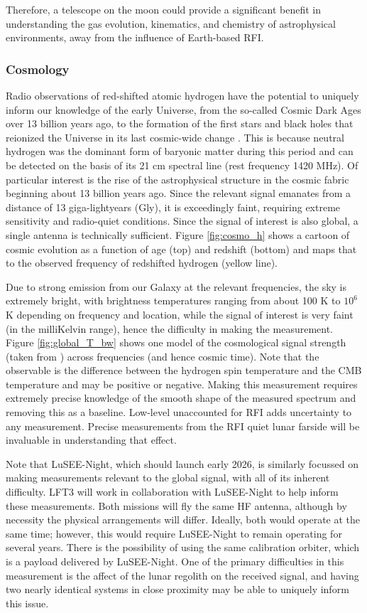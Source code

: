 Therefore, a telescope on the moon could provide a significant benefit in understanding the gas evolution, kinematics, and chemistry of astrophysical environments, away from the influence of Earth-based RFI.

\subsubsection{Cosmology}
Radio observations of red-shifted atomic hydrogen have the potential to uniquely inform our knowledge of the early Universe, from the so-called Cosmic Dark Ages over 13 billion years ago, to the formation of the first stars and black holes that reionized the Universe in its last cosmic-wide change \citep{Fialkov_2024}. This is because neutral hydrogen was the dominant form of baryonic matter during this period and can be detected on the basis of its 21 cm spectral line (rest frequency 1420 MHz). Of particular interest is the rise of the astrophysical structure in the cosmic fabric beginning about 13 billion years ago.  Since the relevant signal emanates from a distance of 13 giga-lightyears (Gly), it is exceedingly faint, requiring extreme sensitivity and radio-quiet conditions.  Since the signal of interest is also global, a single antenna is technically sufficient.  Figure \ref{fig:cosmo_h} shows a cartoon of cosmic evolution as a function of age (top) and redshift (bottom) and maps that to the observed frequency of redshifted hydrogen (yellow line).

Due to strong emission from our Galaxy at the relevant frequencies, the sky is extremely bright, with brightness temperatures ranging from about 100 K to $10^6$K depending on frequency and location, while the signal of interest is very faint (in the milliKelvin range), hence the difficulty in making the measurement.  Figure \ref{fig:global_T_bw} shows one model of the cosmological signal strength (taken from \citealt{Fialkov_2024}) across frequencies (and hence cosmic time).  Note that the observable is the difference between the hydrogen spin temperature and the CMB temperature and may be positive or negative.  Making this measurement requires extremely precise knowledge of the smooth shape of the measured spectrum and removing this as a baseline.  Low-level unaccounted for RFI adds uncertainty to any measurement. Precise measurements from the RFI quiet lunar farside will be invaluable in understanding that effect.

Note that LuSEE-Night, which should launch early 2026, is similarly focussed on making measurements relevant to the global signal, with all of its inherent difficulty.  LFT3 will work in collaboration with LuSEE-Night to help inform these measurements.  Both missions will fly the same HF antenna, although by necessity the physical arrangements will differ.  Ideally, both would operate at the same time; however, this would require LuSEE-Night to remain operating for several years.  There is the possibility of using the same calibration orbiter, which is a payload delivered by LuSEE-Night.  One of the primary difficulties in this measurement is the affect of the lunar regolith on the received signal, and having two nearly identical systems in close proximity may be able to uniquely inform this issue.

